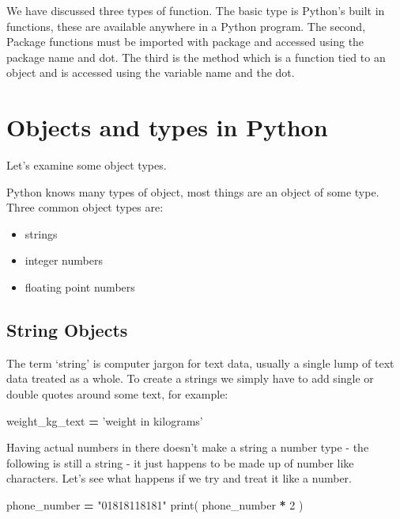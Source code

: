 \documentclass[]{book}
\newenvironment{Shaded}{\begin{snugshade}}{\end{snugshade}}
\newcommand{\BuiltInTok}[1]{#1}
\newcommand{\DecValTok}[1]{\textcolor[rgb]{0.00,0.00,0.81}{#1}}
\newcommand{\NormalTok}[1]{#1}
\newcommand{\OperatorTok}[1]{\textcolor[rgb]{0.81,0.36,0.00}{\textbf{#1}}}
\newcommand{\StringTok}[1]{\textcolor[rgb]{0.31,0.60,0.02}{#1}}
\providecommand{\tightlist}{%
  \setlength{\itemsep}{0pt}\setlength{\parskip}{0pt}}
\theoremstyle{definition}
\theoremstyle{definition}
\theoremstyle{definition}
\theoremstyle{remark}
\let\BeginKnitrBlock\begin \let\EndKnitrBlock\end
\begin{document}
\BeginKnitrBlock{roundup}
We have discussed three types of function. The basic type is Python's
built in functions, these are available anywhere in a Python program.
The second, Package functions must be imported with package and accessed
using the package name and dot. The third is the method which is a
function tied to an object and is accessed using the variable name and
the dot.
\EndKnitrBlock{roundup}

\hypertarget{objects-and-types-in-python}{%
\section{Objects and types in
Python}\label{objects-and-types-in-python}}

Let's examine some object types.

Python knows many types of object, most things are an object of some
type. Three common object types are:

\begin{itemize}
\tightlist
\item
  strings
\item
  integer numbers
\item
  floating point numbers
\end{itemize}

\hypertarget{string-objects}{%
\subsection{String Objects}\label{string-objects}}

The term `string' is computer jargon for text data, usually a single
lump of text data treated as a whole. To create a strings we simply have
to add single or double quotes around some text, for example:

\begin{Shaded}
\begin{Highlighting}[]
\NormalTok{weight_kg_text }\OperatorTok{=} \StringTok{'weight in kilograms'}
\end{Highlighting}
\end{Shaded}

Having actual numbers in there doesn't make a string a number type - the
following is still a string - it just happens to be made up of number
like characters. Let's see what happens if we try and treat it like a
number.

\begin{Shaded}
\begin{Highlighting}[]
\NormalTok{phone_number }\OperatorTok{=} \StringTok{"01818118181"}
\BuiltInTok{print}\NormalTok{( phone_number }\OperatorTok{*} \DecValTok{2}\NormalTok{ )}
\end{Highlighting}
\end{Shaded}
\end{document}
